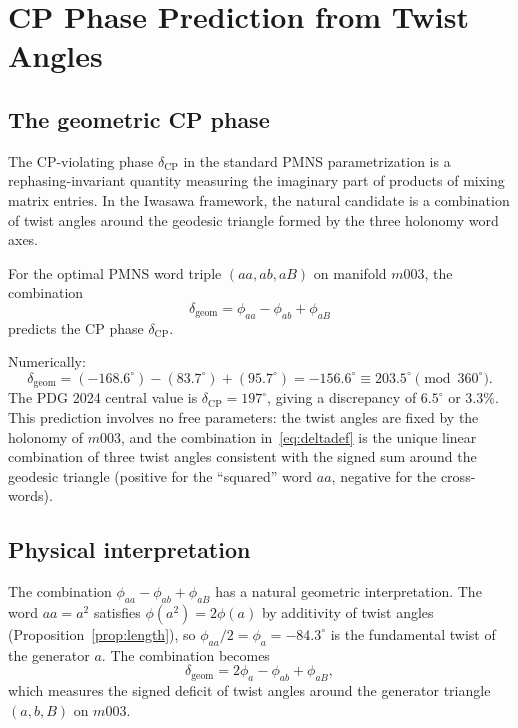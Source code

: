 ﻿\documentclass[epjc3]{svjour3}
\begin{document}
\section{CP Phase Prediction from Twist Angles}
\label{sec:prediction}

\subsection{The geometric CP phase}
\label{subsec:geomcp}

The CP-violating phase $\delta_{\mathrm{CP}}$ in the standard PMNS
parametrization is a rephasing-invariant quantity measuring the
imaginary part of products of mixing matrix entries.  In the Iwasawa
framework, the natural candidate is a combination of twist angles
around the geodesic triangle formed by the three holonomy word axes.

\begin{proposition}
\label{prop:cpphase}
For the optimal PMNS word triple $(aa, ab, aB)$ on manifold $m003$,
the combination
\begin{equation}
  \delta_{\mathrm{geom}} = \phi_{aa} - \phi_{ab} + \phi_{aB}
  \label{eq:deltadef}
\end{equation}
predicts the CP phase $\delta_{\mathrm{CP}}$.
\end{proposition}

Numerically:
\begin{equation}
  \delta_{\mathrm{geom}}
  = (-168.6^\circ) - (83.7^\circ) + (95.7^\circ)
  = -156.6^\circ \equiv 203.5^\circ \pmod{360^\circ}.
  \label{eq:deltanum}
\end{equation}
The PDG 2024 central value is $\delta_{\mathrm{CP}} = 197^\circ$,
giving a discrepancy of $6.5^\circ$ or 3.3\%.  This prediction
involves no free parameters: the twist angles are fixed by the
holonomy of $m003$, and the combination in~\eqref{eq:deltadef} is
the unique linear combination of three twist angles consistent with
the signed sum around the geodesic triangle (positive for the
``squared'' word $aa$, negative for the cross-words).

\subsection{Physical interpretation}
\label{subsec:interp}

The combination $\phi_{aa} - \phi_{ab} + \phi_{aB}$ has a natural
geometric interpretation.  The word $aa = a^2$ satisfies
$\phi(a^2) = 2\phi(a)$ by additivity of twist angles
(Proposition~\ref{prop:length}), so
$\phi_{aa}/2 = \phi_a = -84.3^\circ$ is the fundamental twist of the
generator $a$.  The combination becomes
\begin{equation}
  \delta_{\mathrm{geom}} = 2\phi_a - \phi_{ab} + \phi_{aB},
  \label{eq:deltainterp}
\end{equation}
which measures the signed deficit of twist angles around the generator
triangle $(a, b, B)$ on $m003$.
\end{document}
